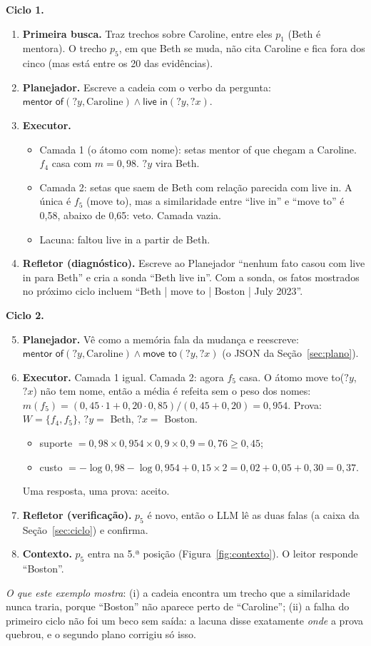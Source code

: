 \documentclass[11pt]{article}
\newcommand{\rel}[1]{\textsf{#1}}
\newcommand{\V}[1]{\mathord{?}\mathit{#1}}
\begin{document}
\textbf{Ciclo 1.}
\begin{enumerate}
\item \textbf{Primeira busca.} Traz trechos sobre Caroline, entre eles $p_1$
  (Beth é mentora). O trecho $p_5$, em que Beth se muda, não cita Caroline e
  fica fora dos cinco (mas está entre os 20 das evidências).
\item \textbf{Planejador.} Escreve a cadeia com o verbo da pergunta:
  $\rel{mentor of}(\V y,\text{Caroline})\wedge\rel{live in}(\V y,\V x)$.
\item \textbf{Executor.}
  \begin{itemize}
  \item Camada 1 (o átomo com nome): setas \rel{mentor of} que chegam a
    Caroline. $f_4$ casa com $m=0{,}98$. $\V y$ vira Beth.
  \item Camada 2: setas que saem de Beth com relação parecida com
    \rel{live in}. A única é $f_5$ (\rel{move to}), mas a similaridade entre
    ``live in'' e ``move to'' é 0,58, abaixo de 0,65: veto. Camada vazia.
  \item Lacuna: faltou \rel{live in} a partir de Beth.
  \end{itemize}
\item \textbf{Refletor (diagnóstico).} Escreve ao Planejador ``nenhum fato
  casou com \rel{live in} para Beth'' e cria a sonda ``Beth live in''. Com a
  sonda, os fatos mostrados no próximo ciclo incluem
  ``Beth | move to | Boston | July 2023''.
\end{enumerate}

\textbf{Ciclo 2.}
\begin{enumerate}\setcounter{enumi}{4}
\item \textbf{Planejador.} Vê como a memória fala da mudança e reescreve:
  $\rel{mentor of}(\V y,\text{Caroline})\wedge\rel{move to}(\V y,\V x)$
  (o JSON da Seção~\ref{sec:plano}).
\item \textbf{Executor.} Camada 1 igual. Camada 2: agora $f_5$ casa. O átomo
  \rel{move to}($\V y$, $\V x$) não tem nome, então a média é refeita sem o peso
  dos nomes:
  $m(f_5)=(0{,}45\cdot1+0{,}20\cdot0{,}85)/(0{,}45+0{,}20)=0{,}954$.
  Prova: $W=\{f_4,f_5\}$, $\V y=$ Beth, $\V x=$ Boston.
  \begin{itemize}
  \item suporte $=0{,}98\times0{,}954\times0{,}9\times0{,}9=0{,}76\ge0{,}45$;
  \item custo $=-\log0{,}98-\log0{,}954+0{,}15\times2=0{,}02+0{,}05+0{,}30=0{,}37$.
  \end{itemize}
  Uma resposta, uma prova: aceito.
\item \textbf{Refletor (verificação).} $p_5$ é novo, então o LLM lê as duas
  falas (a caixa da Seção~\ref{sec:ciclo}) e confirma.
\item \textbf{Contexto.} $p_5$ entra na 5.ª posição (Figura~\ref{fig:contexto}).
  O leitor responde ``Boston''.
\end{enumerate}
\emph{O que este exemplo mostra}: (i) a cadeia encontra um trecho que a
similaridade nunca traria, porque ``Boston'' não aparece perto de
``Caroline''; (ii) a falha do primeiro ciclo não foi um beco sem saída: a
lacuna disse exatamente \emph{onde} a prova quebrou, e o segundo plano
corrigiu só isso.
\end{document}
